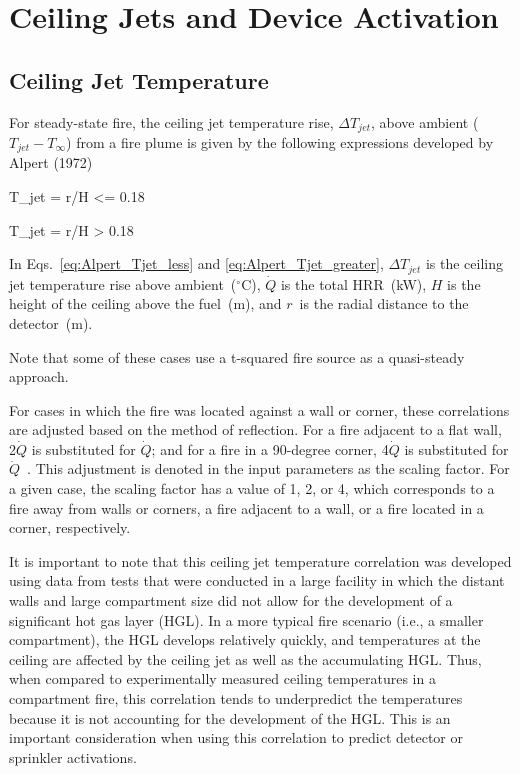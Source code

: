 
\chapter{Ceiling Jets and Device Activation}
\label{Ceiling_Jet_Chapter}

\section{Ceiling Jet Temperature}

For steady-state fire, the ceiling jet temperature rise, $\Delta T_{jet}$, above ambient ($T_{jet} - T_\infty$) from a fire plume is given by the following expressions developed by Alpert (1972)

\be
\Delta T_{jet} =   r/H <= 0.18
\label{eq:Alpert_Tjet_less}
\ee

\be
\Delta T_{jet} =   r/H > 0.18
\label{eq:Alpert_Tjet_greater}
\ee

In Eqs.~\ref{eq:Alpert_Tjet_less} and \ref{eq:Alpert_Tjet_greater}, $\Delta T_{jet}$ is the ceiling jet temperature rise above ambient~($^\circ$C), $\dot Q$ is the total HRR~(kW), $H$ is the height of the ceiling above the fuel~(m), and $r$~is the radial distance to the detector~(m).

Note that some of these cases use a t-squared fire source as a quasi-steady approach.

For cases in which the fire was located against a wall or corner, these correlations are adjusted based on the method of reflection. For a fire adjacent to a flat wall, 2$\dot Q$ is substituted for $\dot Q$; and for a fire in a 90-degree corner, 4$\dot Q$ is substituted for $\dot Q$~\cite{SFPE:Alpert}. This adjustment is denoted in the input parameters as the scaling factor. For a given case, the scaling factor has a value of 1, 2, or 4, which corresponds to a fire away from walls or corners, a fire adjacent to a wall, or a fire located in a corner, respectively.

It is important to note that this ceiling jet temperature correlation was developed using data from tests that were conducted in a large facility in which the distant walls and large compartment size did not allow for the development of a significant hot gas layer (HGL). In a more typical fire scenario (i.e., a smaller compartment), the HGL develops relatively quickly, and temperatures at the ceiling are affected by the ceiling jet as well as the accumulating HGL. Thus, when compared to experimentally measured ceiling temperatures in a compartment fire, this correlation tends to underpredict the temperatures because it is not accounting for the development of the HGL. This is an important consideration when using this correlation to predict detector or sprinkler activations.


